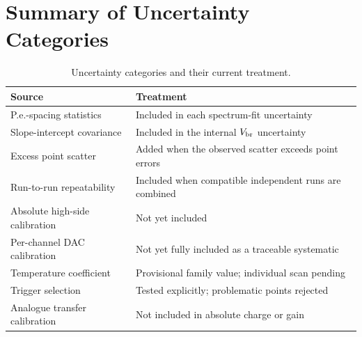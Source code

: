 \section{Summary of Uncertainty Categories}

\begin{table}[htbp]
  \centering
  \caption{Uncertainty categories and their current treatment.}
  \label{tab:uncertainty-summary}
  \begin{tabularx}{0.94\linewidth}{l Y}
    \toprule
    Source & Treatment \\
    \midrule
    P.e.-spacing statistics & Included in each spectrum-fit uncertainty \\
    Slope-intercept covariance & Included in the internal $V_{\mathrm{br}}$ uncertainty \\
    Excess point scatter & Added when the observed scatter exceeds point errors \\
    Run-to-run repeatability & Included when compatible independent runs are combined \\
    Absolute high-side calibration & Not yet included \\
    Per-channel DAC calibration & Not yet fully included as a traceable systematic \\
    Temperature coefficient & Provisional family value; individual scan pending \\
    Trigger selection & Tested explicitly; problematic points rejected \\
    Analogue transfer calibration & Not included in absolute charge or gain \\
    \bottomrule
  \end{tabularx}
\end{table}
